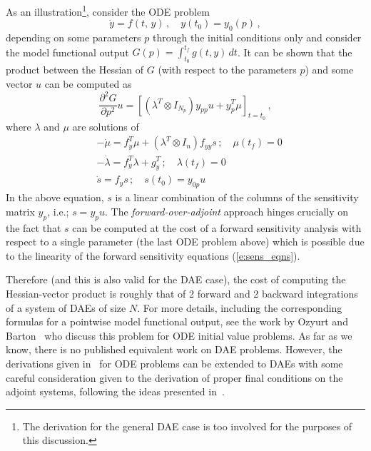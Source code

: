 As an illustration\footnote{The derivation for the general DAE case is too
involved for the purposes of this discussion.}, consider the ODE problem  
\begin{equation*}
{\dot y}  = f(t,\,y) \, , \quad y(t_0)  = y_0(p) \, ,
\end{equation*}
depending on some parameters $p$ through the initial conditions only and
consider the model functional output $G(p) = \int_{t_0}^{t_f} g(t,y) \, dt$.
It can be shown that the product between the Hessian of $G$ (with respect to the 
parameters $p$) and some vector $u$ can be computed as
\begin{equation*}
  \frac{\partial^2 G}{\partial p^2} u = 
  \left[ \left(\lambda^T \otimes I_{N_p} \right) y_{pp}u + y_p^T \mu \right]_{t=t_0} \, ,
\end{equation*}
where $\lambda$ and $\mu$ are solutions of
\begin{equation}
  \begin{split}
    &-\dot\mu = f_y^T\mu + \left(\lambda^T \otimes I_n \right) f_{yy} s \, ; \quad \mu(t_f) = 0 \\
    &-\dot\lambda = f_y^T\lambda + g_y^T \, ; \quad \lambda(t_f) = 0 \\
    &\dot s = f_y s \, ; \quad s(t_0) = y_{0p} u
  \end{split}
\end{equation}
In the above equation, $s$ is a linear combination of the columns of the
sensitivity matrix $y_p$, i.e.; $s = y_p u$. The {\em forward-over-adjoint} 
approach hinges crucially on the fact that $s$ can be computed at the cost of 
a forward sensitivity analysis with respect to a single parameter (the last 
ODE problem above) which is possible due to the linearity of the forward
sensitivity equations (\ref{e:sens_eqns}).

Therefore (and this is also valid for the DAE case), the cost of computing the 
Hessian-vector product is roughly that of 2 forward and 2 backward integrations 
of a system of DAEs of size $N$.
For more details, including the corresponding formulas for a pointwise model
functional output, see the work by Ozyurt and Barton~\cite{OzBa:05} who discuss
this problem for ODE initial value problems. As far as we know, there is no
published equivalent work on DAE problems. However, the derivations given
in~\cite{OzBa:05} for ODE problems can be extended to DAEs with some careful
consideration given to the derivation of proper final conditions on the 
adjoint systems, following the ideas presented in~\cite{CLPS:03}.

